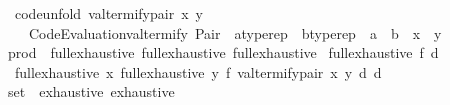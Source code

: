 \begin{isabellebody}
\isanewline
\isanewline
{}\isamarkupfalse%
\isanewline
\ \ {\isacharbrackleft}{\kern0pt}code{\isacharunderscore}{\kern0pt}unfold{\isacharbrackright}{\kern0pt}{\isacharcolon}{\kern0pt}\ {\isachardoublequoteopen}valtermify{\isacharunderscore}{\kern0pt}pair\ x\ y\ {\isacharequal}{\kern0pt}\isanewline
\ \ \ \ Code{\isacharunderscore}{\kern0pt}Evaluation{\isachardot}{\kern0pt}valtermify\ {\isacharparenleft}{\kern0pt}Pair\ {\isacharcolon}{\kern0pt}{\isacharcolon}{\kern0pt}\ {\isacharprime}{\kern0pt}a{\isacharcolon}{\kern0pt}{\isacharcolon}{\kern0pt}typerep\ {\isasymRightarrow}\ {\isacharprime}{\kern0pt}b{\isacharcolon}{\kern0pt}{\isacharcolon}{\kern0pt}typerep\ {\isasymRightarrow}\ {\isacharprime}{\kern0pt}a\ {\isasymtimes}\ {\isacharprime}{\kern0pt}b{\isacharparenright}{\kern0pt}\ {\isacharbraceleft}{\kern0pt}{\isasymcdot}{\isacharbraceright}{\kern0pt}\ x\ {\isacharbraceleft}{\kern0pt}{\isasymcdot}{\isacharbraceright}{\kern0pt}\ y{\isachardoublequoteclose}\isanewline
\isanewline
{}\isamarkupfalse%
\isanewline
\isanewline
{}\isamarkupfalse%
\ prod\ {\isacharcolon}{\kern0pt}{\isacharcolon}{\kern0pt}\ {\isacharparenleft}{\kern0pt}full{\isacharunderscore}{\kern0pt}exhaustive{\isacharcomma}{\kern0pt}\ full{\isacharunderscore}{\kern0pt}exhaustive{\isacharparenright}{\kern0pt}\ full{\isacharunderscore}{\kern0pt}exhaustive\isanewline
{}\isanewline
\isanewline
{}\isamarkupfalse%
\ {\isachardoublequoteopen}full{\isacharunderscore}{\kern0pt}exhaustive\ f\ d\ {\isacharequal}{\kern0pt}\isanewline
\ \ full{\isacharunderscore}{\kern0pt}exhaustive\ {\isacharparenleft}{\kern0pt}{\isasymlambda}x{\isachardot}{\kern0pt}\ full{\isacharunderscore}{\kern0pt}exhaustive\ {\isacharparenleft}{\kern0pt}{\isasymlambda}y{\isachardot}{\kern0pt}\ f\ {\isacharparenleft}{\kern0pt}valtermify{\isacharunderscore}{\kern0pt}pair\ x\ y{\isacharparenright}{\kern0pt}{\isacharparenright}{\kern0pt}\ d{\isacharparenright}{\kern0pt}\ d{\isachardoublequoteclose}\isanewline
\isanewline
{}\isamarkupfalse%
%
\isadelimproof
\ %
\endisadelimproof
%
\isatagproof
\isacommand{{\isachardot}{\kern0pt}{\isachardot}{\kern0pt}}\isamarkupfalse%
%
\endisatagproof
{\isafoldproof}%
%
\isadelimproof
%
\endisadelimproof
\isanewline
\isanewline
{}\isamarkupfalse%
\isanewline
\isanewline
{}\isamarkupfalse%
\ set\ {\isacharcolon}{\kern0pt}{\isacharcolon}{\kern0pt}\ {\isacharparenleft}{\kern0pt}exhaustive{\isacharparenright}{\kern0pt}\ exhaustive\isanewline
{}\isanewline

\end{isabellebody}
